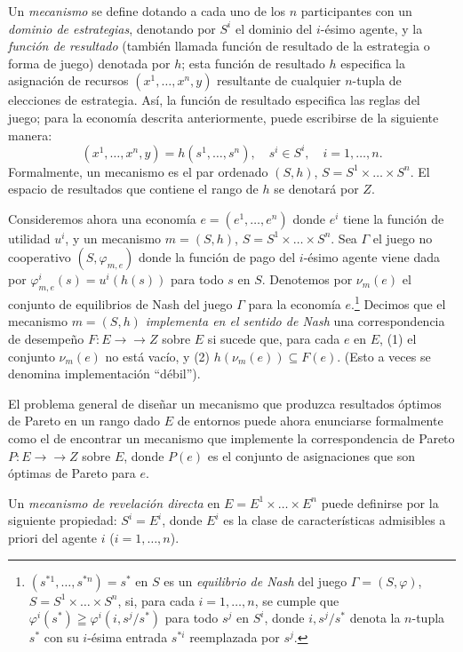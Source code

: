 \documentclass[12pt, letterpaper]{article}
\begin{document}
Un \textit{mecanismo} se define dotando a cada uno de los $n$ participantes con un \textit{dominio de estrategias}, denotando por $S^i$ el dominio del $i$-ésimo agente, y la \textit{función de resultado} (también llamada función de resultado de la estrategia o forma de juego) denotada por $h$; esta función de resultado $h$ especifica la asignación de recursos $(x^1, \dots, x^n, y)$ resultante de cualquier $n$-tupla de elecciones de estrategia. Así, la función de resultado especifica las reglas del juego; para la economía descrita anteriormente, puede escribirse de la siguiente manera:
\[
(x^1, \dots, x^n, y) = h(s^1, \dots, s^n), \quad s^i \in S^i, \quad i = 1, \dots, n.
\]
Formalmente, un mecanismo es el par ordenado $(S, h)$, $S = S^1 \times \dots \times S^n$. El espacio de resultados que contiene el rango de $h$ se denotará por $Z$.

Consideremos ahora una economía $e = (e^1, \dots, e^n)$ donde $e^i$ tiene la función de utilidad $u^i$, y un mecanismo $m = (S, h)$, $S = S^1 \times \dots \times S^n$. Sea $\Gamma$ el juego no cooperativo $(S, \varphi_{m,e})$ donde la función de pago del $i$-ésimo agente viene dada por $\varphi^i_{m,e}(s) = u^i(h(s))$ para todo $s$ en $S$. Denotemos por $\nu_m(e)$ el conjunto de equilibrios de Nash del juego $\Gamma$ para la economía $e$.\footnote{$(s^{*1}, \dots, s^{*n}) = s^*$ en $S$ es un \textit{equilibrio de Nash} del juego $\Gamma = (S, \varphi)$, $S = S^1 \times \dots \times S^n$, si, para cada $i = 1, \dots, n$, se cumple que $\varphi^i(s^*) \geqq \varphi^i(i, s^j/s^*)$ para todo $s^j$ en $S^i$, donde $i, s^j/s^*$ denota la $n$-tupla $s^*$ con su $i$-ésima entrada $s^{*i}$ reemplazada por $s^j$.} Decimos que el mecanismo $m = (S, h)$ \textit{implementa en el sentido de Nash} una correspondencia de desempeño $F \colon E \to\to Z$ sobre $E$ si sucede que, para cada $e$ en $E$, (1) el conjunto $\nu_m(e)$ no está vacío, y (2) $h(\nu_m(e)) \subseteq F(e)$. (Esto a veces se denomina implementación ``débil'').

El problema general de diseñar un mecanismo que produzca resultados óptimos de Pareto en un rango dado $E$ de entornos puede ahora enunciarse formalmente como el de encontrar un mecanismo que implemente la correspondencia de Pareto $P \colon E \to\to Z$ sobre $E$, donde $P(e)$ es el conjunto de asignaciones que son óptimas de Pareto para $e$.

Un \textit{mecanismo de revelación directa} en $E = E^1 \times \dots \times E^n$ puede definirse por la siguiente propiedad: $S^i = E^i$, donde $E^i$ es la clase de características admisibles a priori del agente $i$ ($i = 1, \dots, n$).
\end{document}
